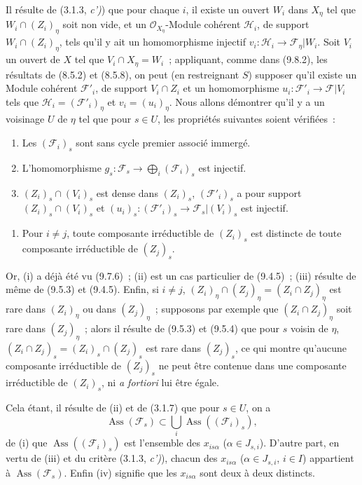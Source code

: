 Il résulte de (3.1.3, \emph{c')}) que pour chaque $i$, il existe un ouvert $W_i$
dans $X_\eta$ tel que $W_i\cap(Z_i)_\eta$ soit non vide, et un
$\mathcal O_{X_\eta}$-Module cohérent $\mathcal H_i$, de support
$W_i\cap(Z_i)_\eta$, tels qu'il y ait un homomorphisme injectif
$v_i:\mathcal H_i\to\mathcal F_\eta|W_i$. Soit $V_i$ un ouvert de $X$ tel que
$V_i\cap X_\eta=W_i$~; appliquant, comme dans (9.8.2), les résultats de (8.5.2)
et (8.5.8), on peut (en restreignant $S$) supposer qu'il existe un Module
cohérent $\mathcal F'_i$, de support $V_i\cap Z_i$ et un homomorphisme
$u_i:\mathcal F'_i\to\mathcal F|V_i$ tels que
$\mathcal H_i=(\mathcal F'_i)_\eta$ et $v_i=(u_i)_\eta$. Nous allons démontrer
qu'il y a un voisinage $U$ de $\eta$ tel que pour $s\in U$, les propriétés
suivantes soient vérifiées~:
\begin{enumerate}[label=\emph{(\roman*)}]
  \item Les $(\mathcal F_i)_s$ sont sans cycle premier associé immergé.
  \item L'homomorphisme
  $g_s:\mathcal F_s\to\bigoplus_i(\mathcal F_i)_s$ est injectif.
  \item $(Z_i)_s\cap(V_i)_s$ est dense dans $(Z_i)_s$,
  $(\mathcal F'_i)_s$ a pour support $(Z_i)_s\cap(V_i)_s$ et
  $(u_i)_s:(\mathcal F'_i)_s\to\mathcal F_s|(V_i)_s$ est injectif.
\end{enumerate}


\begin{enumerate}[label=\emph{(\roman*)}]
  \item[(iv)] Pour $i\neq j$, toute composante irréductible de $(Z_i)_s$ est
  distincte de toute composante irréductible de $(Z_j)_s$.
\end{enumerate}
Or, (i) a déjà été vu (9.7.6)~; (ii) est un cas particulier de (9.4.5)~; (iii)
résulte de même de (9.5.3) et (9.4.5). Enfin, si $i\neq j$,
$(Z_i)_\eta\cap(Z_j)_\eta=(Z_i\cap Z_j)_\eta$ est rare dans $(Z_i)_\eta$ ou
dans $(Z_j)_\eta$~; supposons par exemple que $(Z_i\cap Z_j)_\eta$ soit rare
dans $(Z_j)_\eta$~; alors il résulte de (9.5.3) et (9.5.4) que pour $s$ voisin
de $\eta$, $(Z_i\cap Z_j)_s=(Z_i)_s\cap(Z_j)_s$ est rare dans $(Z_j)_s$, ce qui
montre qu'aucune composante irréductible de $(Z_j)_s$ ne peut être contenue
dans une composante irréductible de $(Z_i)_s$, ni \emph{a fortiori} lui être
égale.

Cela étant, il résulte de (ii) et de (3.1.7) que pour $s\in U$, on a
\[
\operatorname{Ass}(\mathcal F_s)\subset
\bigcup_i\operatorname{Ass}((\mathcal F_i)_s),
\]
de (i) que $\operatorname{Ass}((\mathcal F_i)_s)$ est l'ensemble des
$x_{is\alpha}$ ($\alpha\in J_{s,i}$). D'autre part, en vertu de (iii) et du
critère (3.1.3, \emph{c')}), chacun des $x_{is\alpha}$ ($\alpha\in J_{s,i}$,
$i\in I$) appartient à $\operatorname{Ass}(\mathcal F_s)$. Enfin (iv) signifie
que les $x_{is\alpha}$ sont deux à deux distincts.

